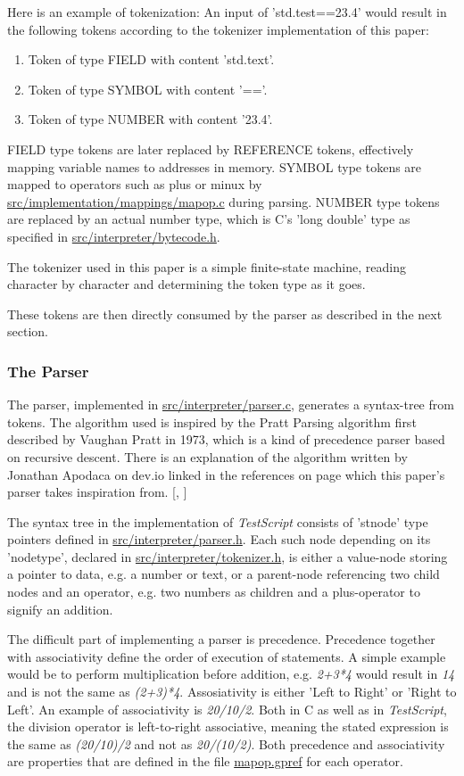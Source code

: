 \documentclass[12pt,a4paper]{article}
\newcommand{\hrc}[1]{\hyperref[#1]{#1}}
\newcommand{\name}{\emph{TestScript}}
\begin{document}
Here is an example of tokenization:
An input of 'std.test==23.4' would result in the following tokens according
to the tokenizer implementation of this paper:
\begin{enumerate}
    \item Token of type FIELD with content 'std.text'.
    \item Token of type SYMBOL with content '=='.
    \item Token of type NUMBER with content '23.4'.
\end{enumerate}
FIELD type tokens are later replaced by REFERENCE tokens, effectively mapping
variable names to addresses in memory.
SYMBOL type tokens are mapped to operators such as plus or minux by \hrc{src/implementation/mappings/mapop.c}
during parsing. NUMBER type tokens are replaced by an actual number type, which
is C's 'long double' type as specified in \hrc{src/interpreter/bytecode.h}.

The tokenizer used in this paper is a simple finite-state machine, reading
character by character and determining the token type as it goes.

These tokens are then directly consumed by the parser as described in the next
section.

\subsubsection{The Parser}
The parser, implemented in \hrc{src/interpreter/parser.c}, generates a syntax-tree
from tokens. The algorithm used is inspired by the Pratt Parsing
algorithm first described by Vaughan Pratt in 1973, which is a kind of precedence
parser based on recursive descent. There is an explanation of the algorithm
written by Jonathan Apodaca on dev.io linked in the references on page 
\pageref{bibliography} which this paper's parser takes inspiration from.
[, ]

The syntax tree in the implementation of \name{} consists of 'stnode' type
pointers defined in \hrc{src/interpreter/parser.h}. Each such node depending
on its 'nodetype', declared in \hrc{src/interpreter/tokenizer.h},
is either a value-node storing a pointer to data, e.g. a number or text, or a
parent-node referencing two child nodes and an operator, e.g. two numbers as
children and a plus-operator to signify an addition.

The difficult part of implementing a parser is precedence. Precedence together
with associativity define the order of execution of statements. A simple example
would be to perform multiplication before addition, e.g. \emph{2+3*4} would
result in \emph{14} and is not the same as \emph{(2+3)*4}.
Assosiativity is either 'Left to Right' or 'Right to Left'. An example of associativity is
\emph{20/10/2}. Both in C as well as in \name{}, the division operator is
left-to-right associative, meaning the stated expression is the same as
\emph{(20/10)/2} and not as \emph{20/(10/2)}. Both precedence 
and associativity are properties that are defined in the file \hrc{mapop.gpref} for
each operator.
\end{document}
